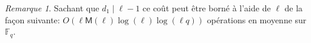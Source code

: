 \documentclass[10pt,a4paper]{book}
\theoremstyle{plain}
\theoremstyle{definition}
\theoremstyle{definition}
\theoremstyle{definition}
\theoremstyle{definition}
\theoremstyle{definition}
\theoremstyle{remark}
\newtheorem{rem}[thm]{Remarque}
\theoremstyle{remark}
\theoremstyle{definition}
\begin{document}
 
\begin{rem}
Sachant que $d_1 \mid \ell-1$ ce coût peut être borné à l'aide de $\ell$ de la façon suivante: $O(\ell\mathsf{M}(\ell)\log(\ell)\log(\ell q))$ opérations en moyenne sur $\mathbb{F}_q$.
\end{rem}
 
\end{document}
